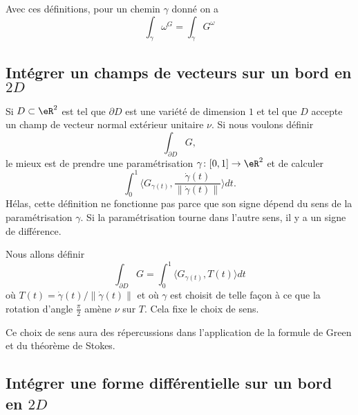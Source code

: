 Avec ces définitions, pour un chemin $\gamma$ donné on a
\begin{equation*}
  \int_\gamma \omega^G = \int_\gamma G^\omega
\end{equation*}

\subsection{Intégrer un champs de vecteurs sur un bord en $2D$}

Si $D\subset\eR^2$ est tel que $\partial D$ est une variété de dimension $1$ et tel que $D$ accepte un champ de vecteur normal extérieur unitaire $\nu$. Si nous voulons définir 
\begin{equation}
	\int_{\partial D}G,
\end{equation}
le mieux est de prendre une paramétrisation $\gamma\colon \mathopen[ 0 , 1 \mathclose]\to \eR^2$ et de calculer
\begin{equation}
	\int_0^1 \langle G_{\gamma(t)}, \frac{ \dot\gamma(t) }{ \| \dot\gamma(t) \| }\rangle dt.
\end{equation}
Hélas, cette définition ne fonctionne pas parce que son signe dépend du sens de la paramétrisation $\gamma$. Si la paramétrisation tourne dans l'autre sens, il y a un signe de différence.

Nous allons définir
\begin{equation}		\label{EqIntVectbordDeux}
	\int_{\partial D}G=\int_0^1\langle G_{\gamma(t)}, T(t)\rangle dt
\end{equation}
où $T(t)=\dot\gamma(t)/\| \dot\gamma(t) \|$ et où $\gamma$ est choisit de telle façon à ce que la rotation d'angle $\frac{ \pi }{ 2 }$ amène $\nu$ sur $T$. Cela fixe le choix de sens.

Ce choix de sens aura des répercussions dans l'application de la formule de Green et du théorème de Stokes.

\subsection{Intégrer une forme différentielle sur un bord en $2D$}


